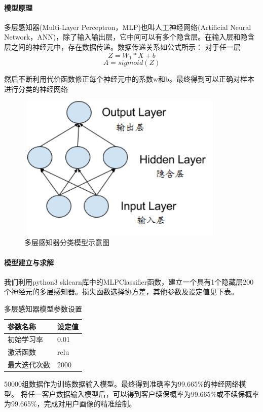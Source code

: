 \documentclass[UTF8,12pt,songti]{ctexart}
\begin{document}
\paragraph{模型原理}  \quad \par
多层感知器(Multi-Layer Perceptron，MLP)也叫人工神经网络(Artificial Neural Network，ANN)，除了输入输出层，它中间可以有多个隐含层。在输入层和隐含层之间的神经元中，存在数据传递。数据传递关系如公式所示： 对于任一层
\begin{equation}\label{MLP1}
Z = W_1 * X + b
\end{equation}
\begin{equation}\label{MLP2}
A = sigmoid(Z)
\end{equation}
\par 然后不断利用代价函数修正每个神经元中的系数w和b。最终得到可以正确对样本进行分类的神经网络
\begin{figure}[H]
\centering
\includegraphics[width=10cm,height=7cm]{4-1-5-1.png}
\caption{多层感知器分类模型示意图}
\end{figure}
\paragraph{模型建立与求解}  \quad \par
我们利用python3 sklearn库中的MLPClassifier函数，建立一个具有1个隐藏层200个神经元的多层感知器。损失函数选择协方差，其他参数及设定值见下表。
\begin{table}[H]
\centering
\begin{tabular}{|p{6cm} |p{6cm} | }%
\hline  %
参数名称&设定值 \\
\hline
初始学习率&0.01 \\
\hline
激活函数&relu \\
\hline
最大迭代次数&2000\\
\hline %
\end{tabular}
\caption{多层感知器模型参数设置}
\end{table}
50000组数据作为训练数据输入模型。最终得到准确率为99.665\%的神经网络模型。      将任一客户数据输入模型后，可以得到客户续保概率为99.665\%或不续保概率为99.665\%，完成对用户画像的精准绘制。
\end{document}
